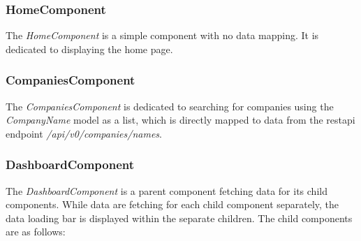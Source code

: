 \subsubsection{HomeComponent}
\label{subsubsec:development-home}
The \textit{HomeComponent} is a simple component with no data mapping. It is dedicated to displaying the home page.

\subsubsection{CompaniesComponent}
\label{subsubsec:development-companies}
The \textit{CompaniesComponent} is dedicated to searching for companies using the \textit{CompanyName} model as a list, which is directly mapped to data from the \acrshort{restapi} endpoint \textit{/api/v0/companies/names}.

\subsubsection{DashboardComponent}
\label{subsubsec:development-dashboard}
The \textit{DashboardComponent} is a parent component fetching data for its child components. While data are fetching for each child component separately, the data loading bar is displayed within the separate children. The child components are as follows:

